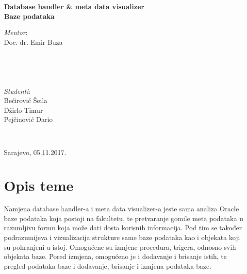 \documentclass[12pt, a4paper]{report}
\theoremstyle{definition}
\begin{document}
\begin{titlepage}
{		
		\begin{center}
		\LARGE 
		\bfseries 
		Database handler \& meta data visualizer \\[0.5cm]
		
		
		\LARGE
		Baze podataka \\[4cm]
		
		\end{center}		 		

		
		\begin{minipage}{0.45\textwidth}
			\begin{flushleft}
				\emph{Mentor}: \\
				Doc. dr. Emir Buza \\
			\end{flushleft}
		\end{minipage}
		~
		\begin{minipage}{0.04\textwidth}
			\begin{flushleft}
				
			\end{flushleft}
		\end{minipage}
		~
		\begin{minipage}{0.45\textwidth}
			\begin{flushright}
				\emph{Studenti}: \\
				Bećirović Šeila\\
				Džirlo Timur\\
				Pejčinović Dario
			\end{flushright}
		\end{minipage}\\[0.7 cm]
		
		\begin{center}
			{\large Sarajevo, 05.11.2017.}\\[1cm] 
		\end{center}
		\normalsize
		
		\vfill 
	}
\end{titlepage}
\renewcommand{\chaptermark}[1]{\markboth{#1}{}}
\lhead{}

\newpage
\begin{spacing}{0.9}
	\tableofcontents
\end{spacing}
\chapter{Opis teme}

Namjena database handler-a i meta data visualizer-a jeste sama analiza Oracle baze podataka koja postoji na fakultetu, te pretvaranje gomile meta podataka u razumljivu formu koja može dati dosta korisnih informacija. Pod tim se također podrazumijeva i vizualizacija strukture same baze podataka kao i objekata koji su pohranjeni u istoj. Omogućene su izmjene procedura, trigera, odnosno svih objekata baze. Pored izmjena, omogućeno je i dodavanje i brisanje istih, te pregled podataka baze i dodavanje, brisanje i izmjena podataka baze.
\end{document}
